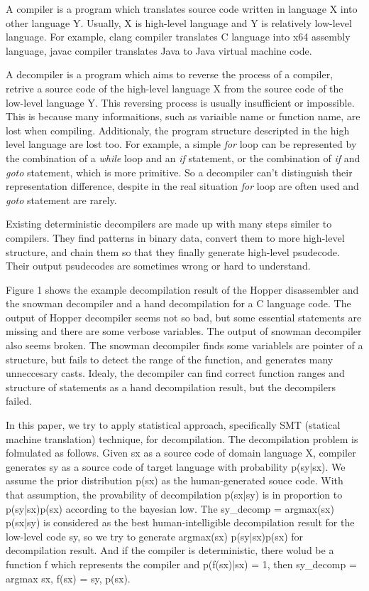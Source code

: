 A compiler is a program which translates source code written in language X into other language Y. 
Usually, X is high-level language and Y is relatively low-level language. 
For example, clang compiler translates C language into x64 assembly language, javac compiler translates Java to Java virtual machine code.

A decompiler is a program which aims to reverse the process of a compiler, retrive a source code of the high-level language X from the source code of the low-level language Y. 
This reversing process is usually insufficient or impossible.
This is because many informaitions, such as variaible name or function name, are lost when compiling.
Additionaly, the program structure descripted in the high level language are lost too. 
For example, a simple {\sl for} loop can be represented by the combination of a {\sl while} loop and an {\sl if} statement, or the combination of {\sl if} and {\sl goto} statement, which is more primitive. 
So a decompiler can't distinguish their representation difference, despite in the real situation {\sl for} loop are often used and {\sl goto} statement are rarely. 

Existing deterministic decompilers are made up with many steps similer to compilers. 
They find patterns in binary data, convert them to more high-level structure, and chain them so that they finally generate high-level psudecode.
Their output psudecodes are sometimes wrong or hard to understand.

Figure 1 shows the example decompilation result of the Hopper disassembler and the snowman decompiler and a hand decompilation for a C language code.
The output of Hopper decompiler seems not so bad, but some essential statements are missing and there are some verbose variables.
The output of snowman decompiler also seems broken. 
The snowman decompiler finds some variablels are pointer of a structure, but fails to detect the range of the function, and generates many unneccesary casts.
Idealy, the decompiler can find correct function ranges and structure of statements as a hand decompilation result, but the decompilers failed.

In this paper, we try to apply statistical approach, specifically SMT (statical machine translation) technique, for decompilation.
The decompilation problem is folmulated as follows. 
Given sx as a source code of domain language X, compiler generates sy as a source code of target language with probability p(sy|sx). 
We assume the prior distribution p(sx) as the human-generated souce code. 
With that assumption, the provability of decompilation p(sx|sy) is in proportion to p(sy|sx)p(sx) according to the bayesian low. 
The sy_decomp = argmax(sx) p(sx|sy) is considered as the best human-intelligible decompilation result for the low-level code sy,  
so we try to generate argmax(sx) p(sy|sx)p(sx) for decompilation result.
And if the compiler is deterministic, there wolud be a function f which represents the compiler and p(f(sx)|sx) = 1,
then sy_decomp = argmax sx, f(sx) = sy, p(sx).

